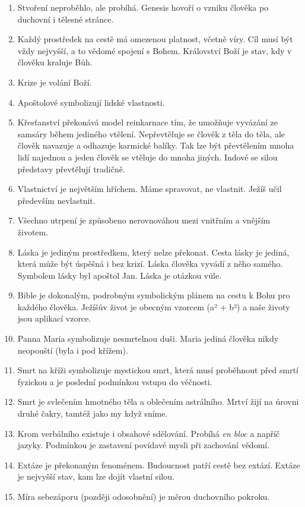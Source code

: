 \begin{enumerate}
{  }
  \item{
    Stvoření neproběhlo, ale probíhá.
    Genesis hovoří o vzniku člověka po duchovní i tělesné stránce.
  }
  \item{
    Každý prostředek na cestě má omezenou platnost, včetně víry.
    Cíl musí být vždy nejvyšší, a to vědomé spojení s Bohem.
    Království Boží je stav, kdy v člověku kraluje Bůh.
  }
  \item{
    Krize je volání Boží.
  }
  \item{
    Apoštolové symbolizují lidské vlastnosti.
  }
  \item{
    Křesťanství překonává model reinkarnace tím, že umožňuje vyvázání ze samsáry během jediného vtělení.
    Nepřevtěluje se člověk z těla do těla, ale člověk navazuje a odhazuje karmické balíky.
    Tak lze být převtělením mnoha lidí najednou a jeden člověk se vtěluje do mnoha jiných.
    Indové se silou představy převtělují tradičně.
  }
  \item{
    Vlastnictví je největším hříchem.
    Máme spravovat, ne vlastnit.
    Ježíš učil především nevlastnit.
  }
  \item{
    Všechno utrpení je způsobeno nerovnováhou mezi vnitřním a vnějším životem.
  }
  \item{
    Láska je jediným prostředkem, který nelze překonat.
    Cesta lásky je jediná, která může být úspěšná i bez krizí.
    Láska člověka vyvádí z něho samého.
    Symbolem lásky byl apoštol Jan.
    Láska je otázkou vůle.
  }
  \item{
    Bible je dokonalým, podrobným symbolickým plánem na cestu k Bohu pro každého člověka.
    Ježíšův život je obecným vzorcem (a² + b²) a naše životy jsou aplikací vzorce.
  }
  \item{
    Panna Maria symbolizuje nesmrtelnou duši.
    Maria jediná člověka nikdy neopouští (byla i pod křížem).
  }
  \item{
    Smrt na kříži symbolizuje mystickou smrt, která musí proběhnout před smrtí fyzickou a je poslední podmínkou vstupu do věčnosti.
  }
  \item{
    Smrt je svlečením hmotného těla a oblečením astrálního.
    Mrtví žijí na úrovni druhé čakry, tamtéž jako my když sníme.
  }
  \item{
    Krom verbálního existuje i obsahové sdělování.
    Probíhá \textit{en bloc} a napříč jazyky.
    Podmínkou je zastavení povídavé mysli při zachování vědomí.
  }
  \item{
    Extáze je překonaným fenoménem.
    Budoucnost patří cestě bez extází.
    Extáze je nejvyšší stav, kam lze dojít vlastní silou.
  }
  \item{
    Míra sebezáporu (později odosobnění) je měrou duchovního pokroku.
  }
\end{enumerate}

